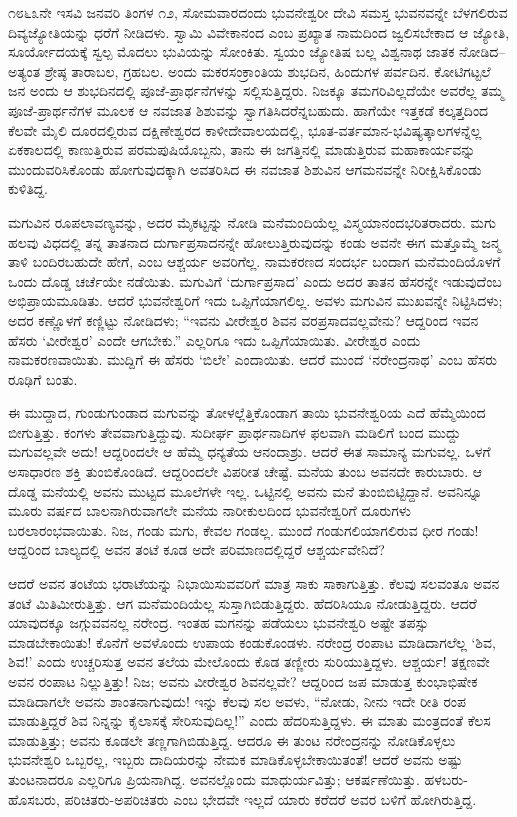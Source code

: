 ೧೮೬೩ನೇ ಇಸವಿ ಜನವರಿ ತಿಂಗಳ ೧೨, ಸೋಮವಾರದಂದು ಭುವನೇಶ್ವರೀ ದೇವಿ ಸಮಸ್ತ ಭುವನವನ್ನೇ ಬೆಳಗಲಿರುವ ದಿವ್ಯಜ್ಯೋತಿಯನ್ನು ಧರೆಗೆ ನೀಡಿದಳು. ಸ್ವಾಮಿ ವಿವೇಕಾನಂದ ಎಂಬ ಪ್ರಖ್ಯಾತ ನಾಮದಿಂದ ಜ್ವಲಿಸಬೇಕಾದ ಆ ಜ್ಯೋತಿ, ಸೂರ್ಯೋದಯಕ್ಕೆ ಸ್ವಲ್ಪ ಮೊದಲು ಭುವಿಯನ್ನು ಸೋಂಕಿತು. ಸ್ವಯಂ ಜ್ಯೋತಿಷ ಬಲ್ಲ ವಿಶ್ವನಾಥ ಜಾತಕ ನೋಡಿದ–ಅತ್ಯಂತ ಶ್ರೇಷ್ಠ ತಾರಾಬಲ, ಗ್ರಹಬಲ. ಅಂದು ಮಕರಸಂಕ್ರಾಂತಿಯ ಶುಭದಿನ, ಹಿಂದುಗಳ ಪರ್ವದಿನ. ಕೋಟಿಗಟ್ಟಲೆ ಜನ ಅಂದು ಆ ಶುಭದಿನದಲ್ಲಿ ಪೂಜೆ-ಪ್ರಾರ್ಥನೆಗಳನ್ನು ಸಲ್ಲಿಸುತ್ತಿದ್ದರು. ನಿಜಕ್ಕೂ ತಮಗರಿವಿಲ್ಲದೆಯೇ ಅವರೆಲ್ಲ ತಮ್ಮ ಪೂಜೆ-ಪ್ರಾರ್ಥನೆಗಳ ಮೂಲಕ ಆ ನವಜಾತ ಶಿಶುವನ್ನು ಸ್ವಾಗತಿಸಿದರೆನ್ನಬಹುದು. ಹಾಗೆಯೇ ಇತ್ತಕಡೆ ಕಲ್ಕತ್ತದಿಂದ ಕೆಲವೇ ಮೈಲಿ ದೂರದಲ್ಲಿರುವ ದಕ್ಷಿಣೇಶ್ವರದ ಕಾಳೀದೇವಾಲಯದಲ್ಲಿ, ಭೂತ-ವರ್ತಮಾನ-ಭವಿಷ್ಯತ್ಕಾಲಗಳನ್ನೆಲ್ಲ ಏಕಕಾಲದಲ್ಲಿ ಕಾಣುತ್ತಿರುವ ಪರಮಪುಷಿಯೊಬ್ಬನು, ತಾನು ಈ ಜಗತ್ತಿನಲ್ಲಿ ಮಾಡುತ್ತಿರುವ ಮಹಾಕಾರ್ಯವನ್ನು ಮುಂದುವರಿಸಿಕೊಂಡು ಹೋಗುವುದಕ್ಕಾಗಿ ಅವತರಿಸಿದ ಈ ನವಜಾತ ಶಿಶುವಿನ ಆಗಮನವನ್ನೇ ನಿರೀಕ್ಷಿಸಿಕೊಂಡು ಕುಳಿತಿದ್ದ.

ಮಗುವಿನ ರೂಪಲಾವಣ್ಯವನ್ನು, ಅದರ ಮೈಕಟ್ಟನ್ನು ನೋಡಿ ಮನೆಮಂದಿಯೆಲ್ಲ ವಿಸ್ಮಯಾನಂದಭರಿತರಾದರು. ಮಗು ಹಲವು ವಿಧದಲ್ಲಿ ತನ್ನ ತಾತನಾದ ದುರ್ಗಾಪ್ರಸಾದನನ್ನೇ ಹೋಲುತ್ತಿರುವುದನ್ನು ಕಂಡು ಅವನೇ ಈಗ ಮತ್ತೊಮ್ಮೆ ಜನ್ಮ ತಾಳಿ ಬಂದಿರಬಹುದೇ ಹೇಗೆ, ಎಂಬ ಆಶ್ಚರ್ಯ ಅವರಿಗೆಲ್ಲ. ನಾಮಕರಣದ ಸಂದರ್ಭ ಬಂದಾಗ ಮನೆಮಂದಿಯೊಳಗೆ ಒಂದು ದೊಡ್ಡ ಚರ್ಚೆಯೇ ನಡೆಯಿತು. ಮಗುವಿಗೆ ‘ದುರ್ಗಾಪ್ರಸಾದ’ ಎಂದು ಅದರ ತಾತನ ಹೆಸರನ್ನೇ ಇಡುವುದೆಂಬ ಅಭಿಪ್ರಾಯಮೂಡಿತು. ಆದರೆ ಭುವನೇಶ್ವರಿಗೆ ಇದು ಒಪ್ಪಿಗೆಯಾಗಲಿಲ್ಲ. ಅವಳು ಮಗುವಿನ ಮುಖವನ್ನೇ ನಿಟ್ಟಿಸಿದಳು; ಅದರ ಕಣ್ಣೊಳಗೆ ಕಣ್ಣಿಟ್ಟು ನೋಡಿದಳು; “ಇವನು ವೀರೇಶ್ವರ ಶಿವನ ವರಪ್ರಸಾದವಲ್ಲವೇನು? ಆದ್ದರಿಂದ ಇವನ ಹೆಸರು ‘ವೀರೇಶ್ವರ’ ಎಂದೇ ಆಗಬೇಕು.” ಎಲ್ಲರಿಗೂ ಇದು ಒಪ್ಪಿಗೆಯಾಯಿತು. ವೀರೇಶ್ವರ ಎಂದು ನಾಮಕರಣವಾಯಿತು. ಮುದ್ದಿಗೆ ಈ ಹೆಸರು ‘ಬಿಲೇ’ ಎಂದಾಯಿತು. ಆದರೆ ಮುಂದೆ ‘ನರೇಂದ್ರನಾಥ’ ಎಂಬ ಹೆಸರು ರೂಢಿಗೆ ಬಂತು.

ಈ ಮುದ್ದಾದ, ಗುಂಡುಗುಂಡಾದ ಮಗುವನ್ನು ತೋಳಲ್ಲೆತ್ತಿಕೊಂಡಾಗ ತಾಯಿ ಭುವನೇಶ್ವರಿಯ ಎದೆ ಹೆಮ್ಮೆಯಿಂದ ಬೀಗುತ್ತಿತ್ತು. ಕಂಗಳು ತೇವವಾಗುತ್ತಿದ್ದುವು. ಸುದೀರ್ಘ ಪ್ರಾರ್ಥನಾದಿಗಳ ಫಲವಾಗಿ ಮಡಿಲಿಗೆ ಬಂದ ಮುದ್ದು ಮಗುವಲ್ಲವೇ ಅದು! ಆದ್ದರಿಂದಲೇ ಆ ಹೆಮ್ಮೆ ಧನ್ಯತೆಯ ಆನಂದಾಶ್ರು. ಆದರೆ ಈತ ಸಾಮಾನ್ಯ ಮಗುವಲ್ಲ. ಒಳಗೆ ಅಸಾಧಾರಣ ಶಕ್ತಿ ತುಂಬಿಕೊಂಡಿದೆ. ಆದ್ದರಿಂದಲೇ ವಿಪರೀತ ಚೇಷ್ಟೆ. ಮನೆಯ ತುಂಬ ಅವನದೇ ಕಾರುಬಾರು. ಆ ದೊಡ್ಡ ಮನೆಯಲ್ಲಿ ಅವನು ಮುಟ್ಟದ ಮೂಲೆಗಳೇ ಇಲ್ಲ. ಒಟ್ಟಿನಲ್ಲಿ ಅವನು ಮನೆ ತುಂಬಿಬಿಟ್ಟಿದ್ದಾನೆ. ಅವನಿನ್ನೂ ಮೂರು ವರ್ಷದ ಬಾಲನಾಗಿರುವಾಗಲೇ ಮನೆಯ ನಾರೀಕುಲದಿಂದ ಭುವನೇಶ್ವರಿಗೆ ದೂರುಗಳು ಬರಲಾರಂಭವಾಯಿತು. ನಿಜ, ಗಂಡು ಮಗು, ಕೇವಲ ಗಂಡಲ್ಲ. ಮುಂದೆ ಗಂಡುಗಲಿಯಾಗಲಿರುವ ಧೀರ ಗಂಡು! ಆದ್ದರಿಂದ ಬಾಲ್ಯದಲ್ಲಿ ಅವನ ತಂಟೆ ಕೂಡ ಅದೇ ಪರಿಮಾಣದಲ್ಲಿದ್ದರೆ ಆಶ್ಚರ್ಯವೇನಿದೆ?

ಆದರೆ ಅವನ ತಂಟೆಯ ಭರಾಟೆಯನ್ನು ನಿಭಾಯಿಸುವವರಿಗೆ ಮಾತ್ರ ಸಾಕು ಸಾಕಾಗುತ್ತಿತ್ತು. ಕೆಲವು ಸಲವಂತೂ ಅವನ ತಂಟೆ ಮಿತಿಮೀರುತ್ತಿತ್ತು. ಆಗ ಮನೆಮಂದಿಯೆಲ್ಲ ಸುಸ್ತಾಗಿಬಿಡುತ್ತಿದ್ದರು. ಹೆದರಿಸಿಯೂ ನೋಡುತ್ತಿದ್ದರು. ಆದರೆ ಯಾವುದಕ್ಕೂ ಜಗ್ಗುವವನಲ್ಲ ನರೇಂದ್ರ. ಇಂತಹ ಮಗನನ್ನು ಪಡೆಯಲು ಭುವನೇಶ್ವರಿ ಅಷ್ಟೇ ತಪಸ್ಸು ಮಾಡಬೇಕಾಯಿತು! ಕೊನೆಗೆ ಅವಳೊಂದು ಉಪಾಯ ಕಂಡುಕೊಂಡಳು. ನರೇಂದ್ರ ರಂಪಾಟ ಮಾಡಿದಾಗಲೆಲ್ಲ ‘ಶಿವ, ಶಿವ!’ ಎಂದು ಉಚ್ಚರಿಸುತ್ತ ಅವನ ತಲೆಯ ಮೇಲೊಂದು ಕೊಡ ತಣ್ಣೀರು ಸುರಿಯುತ್ತಿದ್ದಳು. ಆಶ್ಚರ್ಯ! ತಕ್ಷಣವೇ ಅವನ ರಂಪಾಟ ನಿಲ್ಲುತ್ತಿತ್ತು! ನಿಜ; ಅವನು ವೀರೇಶ್ವರ ಶಿವನಲ್ಲವೇ? ಆದ್ದರಿಂದ ಜಪ ಮಾಡುತ್ತ ಕುಂಭಾಭಿಷೇಕ ಮಾಡಿದಾಗಲೇ ಅವನು ಶಾಂತನಾಗುವುದು! ಇನ್ನು ಕೆಲವು ಸಲ ಅವಳು, “ನೋಡು, ನೀನು ಇದೇ ರೀತಿ ರಂಪ ಮಾಡುತ್ತಿದ್ದರೆ ಶಿವ ನಿನ್ನನ್ನು ಕೈಲಾಸಕ್ಕೆ ಸೇರಿಸುವುದಿಲ್ಲ!” ಎಂದು ಹೆದರಿಸುತ್ತಿದ್ದಳು. ಈ ಮಾತು ಮಂತ್ರದಂತೆ ಕೆಲಸ ಮಾಡುತ್ತಿತ್ತು; ಅವನು ಕೂಡಲೇ ತಣ್ಣಗಾಗಿಬಿಡುತ್ತಿದ್ದ. ಆದರೂ ಈ ತುಂಟ ನರೇಂದ್ರನನ್ನು ನೋಡಿಕೊಳ್ಳಲು ಭುವನೇಶ್ವರಿ ಒಬ್ಬರಲ್ಲ, ಇಬ್ಬರು ದಾದಿಯರನ್ನು ನೇಮಕ ಮಾಡಿಕೊಳ್ಳಬೇಕಾಯಿತಂತೆ! ಆದರೆ ಅವನು ಅಷ್ಟು ತುಂಟನಾದರೂ ಎಲ್ಲರಿಗೂ ಪ್ರಿಯನಾಗಿದ್ದ. ಅವನಲ್ಲೊಂದು ಮಾಧುರ್ಯವಿತ್ತು; ಆಕರ್ಷಣೆಯಿತ್ತು. ಹಳಬರು-ಹೊಸಬರು, ಪರಿಚಿತರು-ಅಪರಿಚಿತರು ಎಂಬ ಭೇದವೇ ಇಲ್ಲದೆ ಯಾರು ಕರೆದರೆ ಅವರ ಬಳಿಗೆ ಹೋಗಿರುತ್ತಿದ್ದ.

